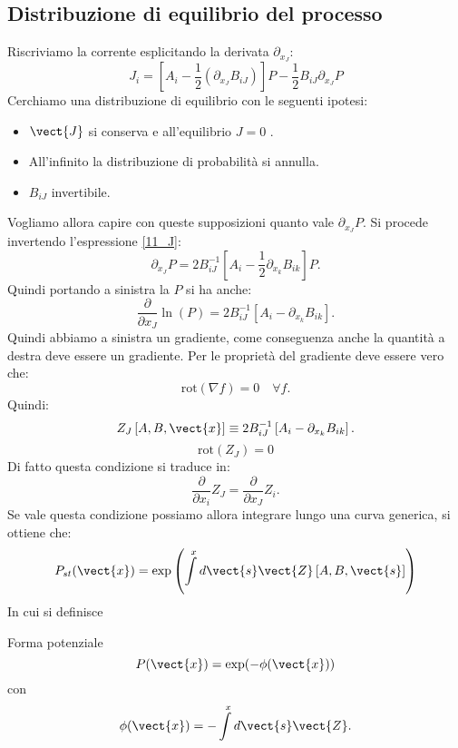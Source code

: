 \subsection{Distribuzione di equilibrio del processo}%
\label{sub:Distribuzione di equilibrio del processo}
Riscriviamo la corrente esplicitando la derivata $\partial_{x_J}$:
\begin{equation}
    J_i = \left[A_i-\frac{1}{2}\left(\partial_{x_J}B_{iJ}\right)\right]P - \frac{1}{2} B_{iJ}\partial_{x_J}P
    \label{eq:11_J}
\end{equation}
Cerchiamo una distribuzione di equilibrio con le seguenti ipotesi:
\begin{itemize}
    \item $\vect{J}$ si conserva e all'equilibrio $J=0$ .
    \item All'infinito la distribuzione di probabilità si annulla.
    \item $B_{iJ}$ invertibile.
\end{itemize}
Vogliamo allora capire con queste supposizioni quanto vale $\partial_{x_J}P$.
Si procede invertendo l'espressione \ref{11_J}:
\[
    \partial_{x_J}P = 2B^{-1}_{iJ}\left[A_i-\frac{1}{2}\partial_{x_k}B_{ik}\right]P
.\] 
Quindi portando a sinistra la $P$ si ha anche:
\[
    \frac{\partial }{\partial x_J} \ln (P) = 2B_{iJ}^{-1}\left[A_i-\partial_{x_k}B_{ik}\right]
.\] 
Quindi abbiamo a sinistra un gradiente, come conseguenza anche la quantità a destra deve essere un gradiente.
Per le proprietà del gradiente deve essere vero che:
\[
    \text{rot}(\nabla f)  = 0 \quad \forall f
.\] 
Quindi:
\[
    Z_J\left[A,B, \vect{x}\right] \equiv 2B_{iJ}^{-1}\left[A_i - \partial_{x_k}B_{ik}\right]
.\] 
\begin{equation}
    \text{rot}(Z_J) = 0
    \label{eq:11_rot}
\end{equation}
Di fatto questa condizione si traduce in:
\[
  \frac{\partial }{\partial x_i} Z_J = \frac{\partial }{\partial x_J} Z_i  
.\] 
Se vale questa condizione possiamo allora integrare lungo una curva generica, si ottiene che:
\[
    P_{st}(\vect{x}) = \exp\left(\int\limits^{x} d\vect{s}\vect{Z}\left[A,B, \vect{s}\right]\right)
\] 
In cui si definisce 
\begin{redbox}{Forma potenziale}
    \begin{equation}
	P(\vect{x})  = \exp (-\phi (\vect{x})) 
	\label{eq:11_forma_pot}
    \end{equation}
    con 
     \[
	\phi (\vect{x}) = - \int\limits^{x} d\vect{s}\vect{Z} 
    .\] 
\end{redbox}
